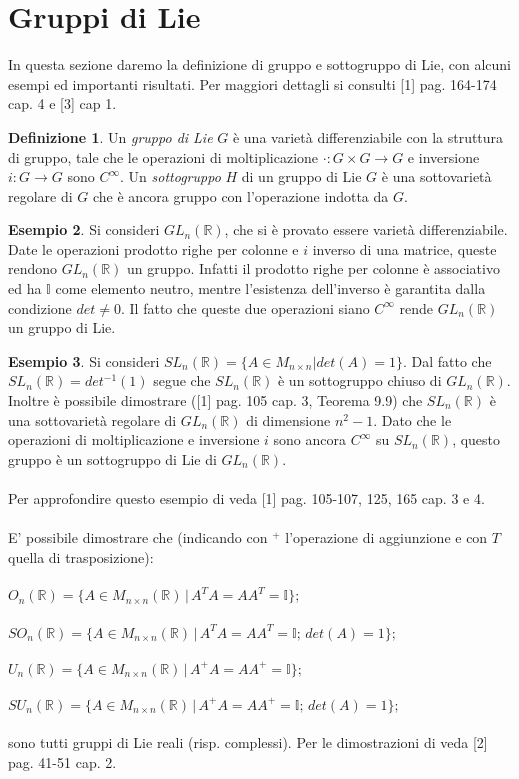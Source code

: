 \documentclass[12pt,a4paper]{report}
\theoremstyle{definition}
\newtheorem{Def}{Definizione}[chapter]
\theoremstyle{Theorem}
\theoremstyle{definition}
\newtheorem{Ex}[Def]{Esempio}
\theoremstyle{definition}
\theoremstyle{definition}
\begin{document}
\section{Gruppi di Lie}
In questa sezione daremo la definizione di gruppo e sottogruppo di Lie, con alcuni esempi ed importanti risultati. Per maggiori dettagli si consulti [1] pag. 164-174 cap. 4 e [3] cap 1.
\begin{Def}
	Un \textit{gruppo di Lie} $G$ è una varietà differenziabile con la struttura di gruppo, tale che le operazioni di moltiplicazione $\cdot:G\times G\rightarrow G$ e inversione $i:G\rightarrow G$ sono $C^\infty$.
	Un \textit{sottogruppo} $H$ di un gruppo di Lie $G$ è una sottovarietà regolare di $G$ che è ancora gruppo con l'operazione indotta da $G$.
\end{Def}
\begin{Ex}
	Si consideri $GL_n(\mathbb{R})$, che si è provato essere varietà differenziabile. Date le operazioni prodotto righe per colonne e $i$ inverso di una matrice, queste rendono $GL_n(\mathbb{R})$ un gruppo. Infatti il prodotto righe per colonne è associativo ed ha $\mathbb{I}$ come elemento neutro, mentre l'esistenza dell'inverso è garantita dalla condizione $det\neq 0$. Il fatto che queste due operazioni siano $C^\infty$ rende $GL_n(\mathbb{R})$ un gruppo di Lie.
\end{Ex}
\begin{Ex}
	Si consideri $SL_n(\mathbb{R})=\{A\in M_{n\times n}| det(A)=1\}$. Dal fatto che $SL_n(\mathbb{R})=det^{-1}(1)$ segue che $SL_n(\mathbb{R})$ è un sottogruppo chiuso di $GL_n(\mathbb{R})$. Inoltre è possibile dimostrare ([1] pag. 105 cap. 3, Teorema 9.9) che $SL_n(\mathbb{R})$ è una sottovarietà regolare di $GL_n(\mathbb{R})$ di dimensione $n^2-1$. Dato che le operazioni di moltiplicazione e inversione $i$ sono ancora $C^\infty$ su $SL_n(\mathbb{R})$, questo gruppo è un sottogruppo di Lie di $GL_n(\mathbb{R})$.\\
	\\
	Per approfondire questo esempio di veda [1] pag. 105-107, 125, 165 cap. 3 e 4.\\
	\\
	E' possibile dimostrare che (indicando con $^+$ l'operazione di aggiunzione e con $T$ quella di trasposizione):\\\\
	$O_n(\mathbb{R})=\{A\in M_{n\times n}(\mathbb{R})\, |\, A^TA=AA^T=\mathbb{I}\};$\\\\
	$SO_n(\mathbb{R})=\{A\in M_{n\times n}(\mathbb{R})\, |\, A^TA=AA^T=\mathbb{I};\, det(A)=1\};$\\\\
	$U_n(\mathbb{R})=\{A\in M_{n\times n}(\mathbb{R})\, |\, A^+A=AA^+=\mathbb{I}\};$\\\\
	$SU_n(\mathbb{R})=\{A\in M_{n\times n}(\mathbb{R})\, |\, A^+A=AA^+=\mathbb{I};\,det(A)=1\};$\\\\
	sono tutti gruppi di Lie reali (risp. complessi). 
	Per le dimostrazioni di veda [2] pag. 41-51 cap. 2.
\end{Ex}
\end{document}
